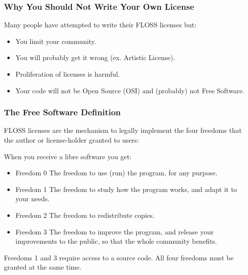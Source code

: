 
\begin{frame}
\frametitle{Why You Should Not Write Your Own License}

Many people have attempted to write their FLOSS licenses but:

\begin{itemize}
\item You limit your community. 
\item You will probably get it wrong (ex. Artistic License).
\item Proliferation of licenses is harmful. 
\item Your code will not be Open Source (OSI) and (probably) not Free Software.
\end{itemize}

\end{frame}




\begin{frame}
\frametitle{The Free Software Definition}
FLOSS licenses are the mechanism to legally implement the four freedoms that the author or license-holder granted to users:

\bigskip

When you receive a libre software you get:
\begin{itemize}
\item {\alert{Freedom 0} The freedom to use (run) the program, for any purpose.}
\item {\alert{Freedom 1} The freedom to study how the program works, and adapt it to your needs. }
\item {\alert{Freedom 2} The freedom to redistribute copies.}
\item {\alert{Freedom 3} The freedom to improve the program, and release your improvements to the public, so that the whole community benefits. }
\end{itemize}

\pause

Freedoms 1 and 3 require access to a source code. All four freedoms must be granted \alert{at the same time}. 


\end{frame}

